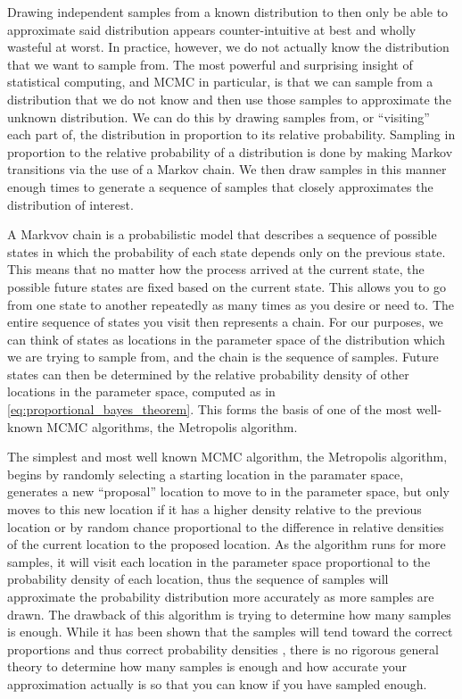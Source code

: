 Drawing independent samples from a known distribution to then only be able to approximate said distribution appears counter-intuitive at best and wholly wasteful at worst. In practice, however, we do not actually know the distribution that we want to sample from. The most powerful and surprising insight of statistical computing, and MCMC in particular, is that we can sample from a distribution that we do not know and then use those samples to approximate the unknown distribution. We can do this by drawing samples from, or ``visiting'' each part of, the distribution in proportion to its relative probability. Sampling in proportion to the relative probability of a distribution is done by making Markov transitions via the use of a Markov chain. We then draw samples in this manner enough times to generate a sequence of samples that closely approximates the distribution of interest.

A Markvov chain is a probabilistic model that describes a sequence of possible states in which the probability of each state depends only on the previous state. This means that no matter how the process arrived at the current state, the possible future states are fixed based on the current state. This allows you to go from one state to another repeatedly as many times as you desire or need to. The entire sequence of states you visit then represents a chain. For our purposes, we can think of states as locations in the parameter space of the distribution which we are trying to sample from, and the chain is the sequence of samples. Future states can then be determined by the relative probability density of other locations in the parameter space, computed as in \ref{eq:proportional_bayes_theorem}. This forms the basis of one of the most well-known MCMC algorithms, the Metropolis algorithm.

The simplest and most well known MCMC algorithm, the Metropolis algorithm, begins by randomly selecting a starting location in the paramater space, generates a new ``proposal'' location to move to in the parameter space, but only moves to this new location if it has a higher density relative to the previous location or by random chance proportional to the difference in relative densities of the current location to the proposed location. As the algorithm runs for more samples, it will visit each location in the parameter space proportional to the probability density of each location, thus the sequence of samples will approximate the probability distribution more accurately as more samples are drawn. The drawback of this algorithm is trying to determine how many samples is enough. While it has been shown that the samples will tend toward the correct proportions and thus correct probability densities \cite{Metropolis1953} \cite{Hastings1970}, there is no rigorous general theory to determine how many samples is enough and how accurate your approximation actually is so that you can know if you have sampled enough.

